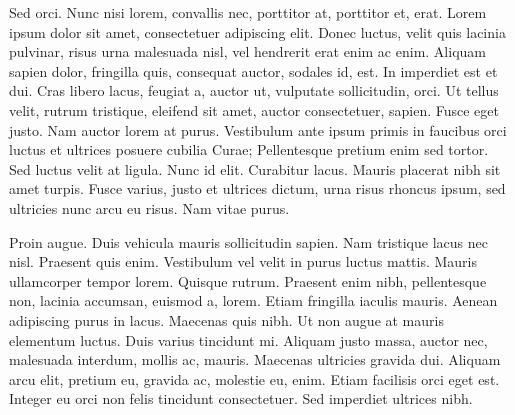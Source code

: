 Sed orci. Nunc nisi lorem, convallis nec, porttitor at, porttitor et, erat.
Lorem ipsum dolor sit amet, consectetuer adipiscing elit. Donec luctus, velit
quis lacinia pulvinar, risus urna malesuada nisl, vel hendrerit erat enim ac
enim. Aliquam sapien dolor, fringilla quis, consequat auctor, sodales id,
est. In imperdiet est et dui. Cras libero lacus, feugiat a, auctor ut,
vulputate sollicitudin, orci. Ut tellus velit, rutrum tristique, eleifend sit
amet, auctor consectetuer, sapien. Fusce eget justo. Nam auctor lorem at
purus. Vestibulum ante ipsum primis in faucibus orci luctus et ultrices
posuere cubilia Curae; Pellentesque pretium enim sed tortor. Sed luctus velit
at ligula. Nunc id elit. Curabitur lacus. Mauris placerat nibh sit amet
turpis. Fusce varius, justo et ultrices dictum, urna risus rhoncus ipsum, sed
ultricies nunc arcu eu risus. Nam vitae purus.

Proin augue. Duis vehicula mauris sollicitudin sapien. Nam tristique lacus
nec nisl. Praesent quis enim. Vestibulum vel velit in purus luctus mattis.
Mauris ullamcorper tempor lorem. Quisque rutrum. Praesent enim nibh,
pellentesque non, lacinia accumsan, euismod a, lorem. Etiam fringilla
iaculis mauris. Aenean adipiscing purus in lacus. Maecenas quis nibh. Ut
non augue at mauris elementum luctus. Duis varius tincidunt mi. Aliquam
justo massa, auctor nec, malesuada interdum, mollis ac, mauris. Maecenas
ultricies gravida dui. Aliquam arcu elit, pretium eu, gravida ac, molestie
eu, enim. Etiam facilisis orci eget est. Integer eu orci non felis tincidunt
consectetuer. Sed imperdiet ultrices nibh.
